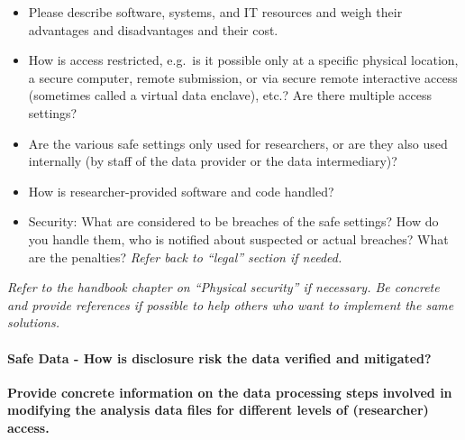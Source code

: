 \documentclass[
]{WileySix}
\providecommand{\tightlist}{%
  \setlength{\itemsep}{0pt}\setlength{\parskip}{0pt}}
\begin{document}
\begin{itemize}
\tightlist
\item
  Please describe software, systems, and IT resources and weigh their advantages and disadvantages and their cost.
\item
  How is access restricted, e.g.~is it possible only at a specific physical location, a secure computer, remote submission, or via secure remote interactive access (sometimes called a virtual data enclave), etc.? Are there multiple access settings?
\item
  Are the various safe settings only used for researchers, or are they also used internally (by staff of the data provider or the data intermediary)?
\item
  How is researcher-provided software and code handled?
\item
  Security: What are considered to be breaches of the safe settings? How do you handle them, who is notified about suspected or actual breaches? What are the penalties? \emph{Refer back to ``legal'' section if needed.}
\end{itemize}

\emph{Refer to the handbook chapter on ``Physical security'' if necessary. Be concrete and provide references if possible to help others who want to implement the same solutions.}

\hypertarget{safe-data---how-is-disclosure-risk-the-data-verified-and-mitigated}{%
\paragraph{Safe Data - How is disclosure risk the data verified and mitigated?}\label{safe-data---how-is-disclosure-risk-the-data-verified-and-mitigated}}

\textbf{Provide concrete information on the data processing steps involved in modifying the analysis data files for different levels of (researcher) access.}
\end{document}
